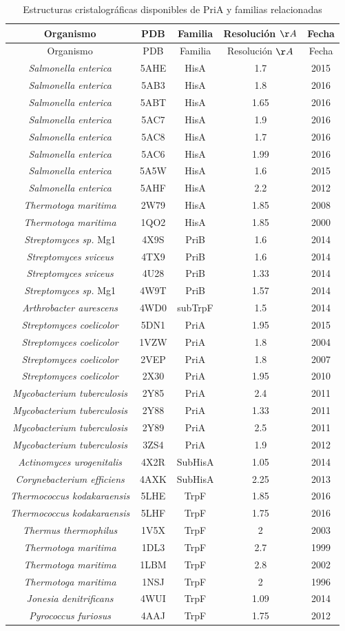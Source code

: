 \documentclass[12pt,twoside]{reedthesis}
\begin{document}
  \begin{longtable}[]{@{}ccccc@{}}
  \caption{Estructuras cristalográficas disponibles de PriA y familias
  relacionadas \label{tab:EnzymePDB}}\tabularnewline
  \toprule
  Organismo & PDB & Familia & Resolución \({\AA}\) & Fecha\tabularnewline
  \midrule
  \endfirsthead
  \toprule
  Organismo & PDB & Familia & Resolución \({\AA}\) & Fecha\tabularnewline
  \midrule
  \endhead
  \emph{Salmonella enterica} & 5AHE & HisA & 1.7 & 2015\tabularnewline
  \emph{Salmonella enterica} & 5AB3 & HisA & 1.8 & 2016\tabularnewline
  \emph{Salmonella enterica} & 5ABT & HisA & 1.65 & 2016\tabularnewline
  \emph{Salmonella enterica} & 5AC7 & HisA & 1.9 & 2016\tabularnewline
  \emph{Salmonella enterica} & 5AC8 & HisA & 1.7 & 2016\tabularnewline
  \emph{Salmonella enterica} & 5AC6 & HisA & 1.99 & 2016\tabularnewline
  \emph{Salmonella enterica} & 5A5W & HisA & 1.6 & 2015\tabularnewline
  \emph{Salmonella enterica} & 5AHF & HisA & 2.2 & 2012\tabularnewline
  \emph{Thermotoga maritima} & 2W79 & HisA & 1.85 & 2008\tabularnewline
  \emph{Thermotoga maritima} & 1QO2 & HisA & 1.85 & 2000\tabularnewline
  \emph{Streptomyces sp.} Mg1 & 4X9S & PriB & 1.6 & 2014\tabularnewline
  \emph{Streptomyces sviceus} & 4TX9 & PriB & 1.6 & 2014\tabularnewline
  \emph{Streptomyces sviceus} & 4U28 & PriB & 1.33 & 2014\tabularnewline
  \emph{Streptomyces sp.} Mg1 & 4W9T & PriB & 1.57 & 2014\tabularnewline
  \emph{Arthrobacter aurescens} & 4WD0 & subTrpF & 1.5 &
  2014\tabularnewline
  \emph{Streptomyces coelicolor} & 5DN1 & PriA & 1.95 &
  2015\tabularnewline
  \emph{Streptomyces coelicolor} & 1VZW & PriA & 1.8 & 2004\tabularnewline
  \emph{Streptomyces coelicolor} & 2VEP & PriA & 1.8 & 2007\tabularnewline
  \emph{Streptomyces coelicolor} & 2X30 & PriA & 1.95 &
  2010\tabularnewline
  \emph{Mycobacterium tuberculosis} & 2Y85 & PriA & 2.4 &
  2011\tabularnewline
  \emph{Mycobacterium tuberculosis} & 2Y88 & PriA & 1.33 &
  2011\tabularnewline
  \emph{Mycobacterium tuberculosis} & 2Y89 & PriA & 2.5 &
  2011\tabularnewline
  \emph{Mycobacterium tuberculosis} & 3ZS4 & PriA & 1.9 &
  2012\tabularnewline
  \emph{Actinomyces urogenitalis} & 4X2R & SubHisA & 1.05 &
  2014\tabularnewline
  \emph{Corynebacterium efficiens} & 4AXK & SubHisA & 2.25 &
  2013\tabularnewline
  \emph{Thermococcus kodakaraensis} & 5LHE & TrpF & 1.85 &
  2016\tabularnewline
  \emph{Thermococcus kodakaraensis} & 5LHF & TrpF & 1.75 &
  2016\tabularnewline
  \emph{Thermus thermophilus} & 1V5X & TrpF & 2 & 2003\tabularnewline
  \emph{Thermotoga maritima} & 1DL3 & TrpF & 2.7 & 1999\tabularnewline
  \emph{Thermotoga maritima} & 1LBM & TrpF & 2.8 & 2002\tabularnewline
  \emph{Thermotoga maritima} & 1NSJ & TrpF & 2 & 1996\tabularnewline
  \emph{Jonesia denitrificans} & 4WUI & TrpF & 1.09 & 2014\tabularnewline
  \emph{Pyrococcus furiosus} & 4AAJ & TrpF & 1.75 & 2012\tabularnewline
  \bottomrule
  \end{longtable}
  
\end{document}
